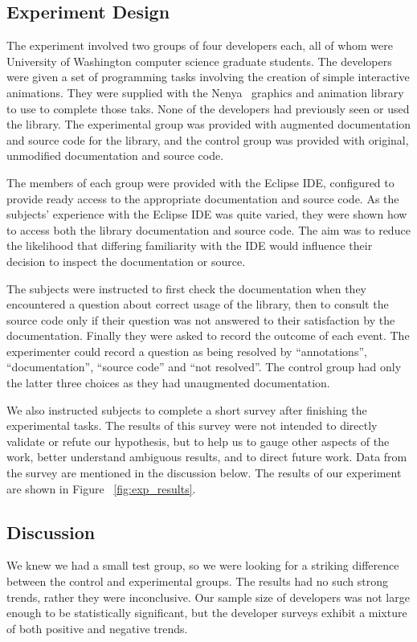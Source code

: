 \subsection{Experiment Design}
The experiment involved two groups of four developers each, all of whom were
University of Washington computer science graduate students. The developers
were given a set of programming tasks involving the creation of simple
interactive animations. They were supplied with the Nenya~\cite{nenya} graphics
and animation library to use to complete those taks. None of the developers had
previously seen or used the library. The experimental group was provided with
augmented documentation and source code for the library, and the control group
was provided with original, unmodified documentation and source code.

The members of each group were provided with the Eclipse IDE, configured to
provide ready access to the appropriate documentation and source code. As the
subjects' experience with the Eclipse IDE was quite varied, they were shown how
to access both the library documentation and source code. The aim was to reduce
the likelihood that differing familiarity with the IDE would influence their
decision to inspect the documentation or source.

The subjects were instructed to first check the documentation when they
encountered a question about correct usage of the library, then to consult the
source code only if their question was not answered to their satisfaction by
the documentation. Finally they were asked to record the outcome of each event.
The experimenter could record a question as being resolved by ``annotations'',
``documentation'', ``source code'' and ``not resolved''. The control group had
only the latter three choices as they had unaugmented documentation.

We also instructed subjects to complete a short survey after finishing the
experimental tasks. The results of this survey were not intended to directly
validate or refute our hypothesis, but to help us to gauge other aspects of the
work, better understand ambiguous results, and to direct future work. Data from
the survey are mentioned in the discussion below. The results of our experiment
are shown in Figure ~\ref{fig:exp_results}.

\subsection{Discussion}
We knew we had a small test group, so we were looking for a striking difference
between the control and experimental groups.  The results had no such strong
trends, rather they were inconclusive.  Our sample size of developers was not
large enough to be statistically significant, but the developer surveys exhibit
a mixture of both positive and negative trends.

